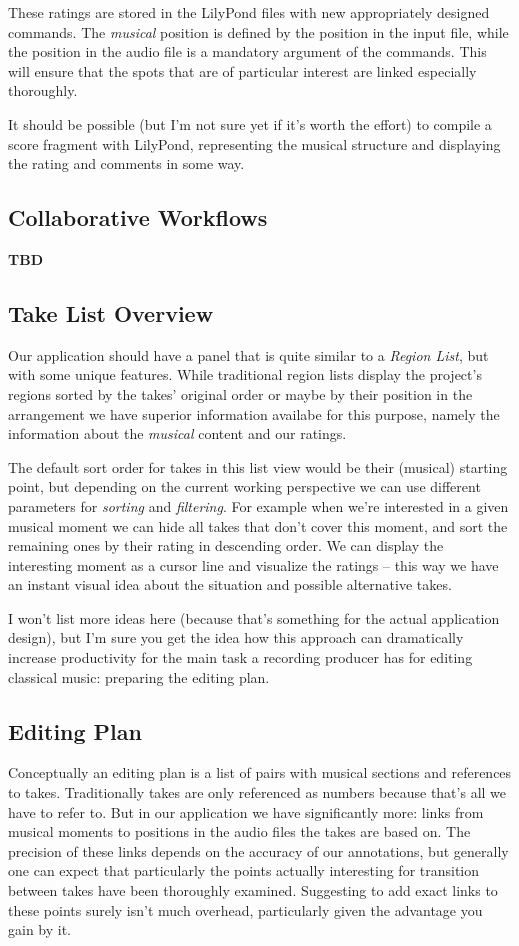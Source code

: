 \documentclass[11pt,a4paper]{article}
\begin{document}
These ratings are stored in the LilyPond files with new appropriately designed commands.
The \emph{musical} position is defined by the position in the input file, while the position in the audio file is a mandatory argument of the commands.
This will ensure that the spots that are of particular interest are linked especially thoroughly.

It should be possible (but I'm not sure yet if it's worth the effort) to compile a score fragment with LilyPond, representing the musical structure and displaying the rating and comments in some way.

\subsection{Collaborative Workflows}

\textbf{TBD}

\subsection{Take List Overview}
Our application should have a panel that is quite similar to a \emph{Region List}, but with some unique features.
While traditional region lists display the project's regions sorted by the takes' original order or maybe by their position in the arrangement we have superior information availabe for this purpose, namely the information about the \emph{musical} content and our ratings.

The default sort order for takes in this list view would be their (musical) starting point, but depending on the current working perspective we can use different parameters for \emph{sorting} and \emph{filtering}.
For example when we're interested in a given musical moment we can hide all takes that don't cover this moment, and sort the remaining ones by their rating in descending order.
We can display the interesting moment as a cursor line and visualize the ratings -- this way we have an instant visual idea about the situation and possible alternative takes.

I won't list more ideas here (because that's something for the actual application design), but I'm sure you get the idea how this approach can dramatically increase productivity for the main task a recording producer has for editing classical music: preparing the editing plan.

\subsection{Editing Plan}
Conceptually an editing plan is a list of pairs with musical sections and references to takes.
Traditionally takes are only referenced as numbers because that's all we have to refer to.
But in our application we have significantly more: links from musical moments to positions in the audio files the takes are based on.
The precision of these links depends on the accuracy of our annotations, but generally one can expect that particularly the points actually interesting for transition between takes have been thoroughly examined.
Suggesting to add exact links to these points surely isn't much overhead, particularly given the advantage you gain by it.
\end{document}
